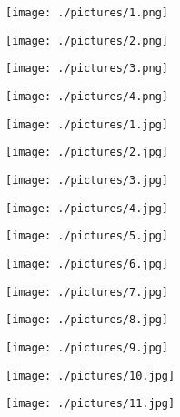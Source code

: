 \begin{center}
  \texttt{[image: ./pictures/1.png]}
\end{center}
\begin{center}
  \texttt{[image: ./pictures/2.png]}
\end{center}
\begin{center}
  \texttt{[image: ./pictures/3.png]}
\end{center}
\begin{center}
  \texttt{[image: ./pictures/4.png]}
\end{center}
\begin{center}
  \texttt{[image: ./pictures/1.jpg]}
\end{center}
\begin{center}
  \texttt{[image: ./pictures/2.jpg]}
\end{center}
\begin{center}
  \texttt{[image: ./pictures/3.jpg]}
\end{center}
\begin{center}
  \texttt{[image: ./pictures/4.jpg]}
\end{center}
\begin{center}
  \texttt{[image: ./pictures/5.jpg]}
\end{center}
\begin{center}
  \texttt{[image: ./pictures/6.jpg]}
\end{center}
\begin{center}
  \texttt{[image: ./pictures/7.jpg]}
\end{center}
\begin{center}
  \texttt{[image: ./pictures/8.jpg]}
\end{center}
\begin{center}
  \texttt{[image: ./pictures/9.jpg]}
\end{center}
\begin{center}
  \texttt{[image: ./pictures/10.jpg]}
\end{center}
\begin{center}
  \texttt{[image: ./pictures/11.jpg]}
\end{center}
